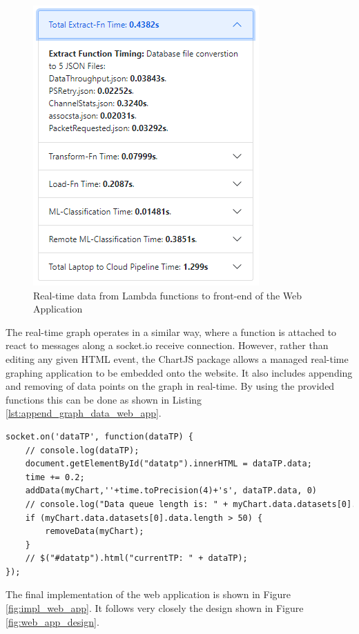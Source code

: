 \begin{figure}[ht]
    \centering
    \includegraphics[width=0.5\linewidth]{pages/Chapter4/Chapter 4 Images/newTiming.PNG}
    \caption{Real-time data from Lambda functions to front-end of the Web Application}
    \label{fig:real_time_data_front_end}
\end{figure}

The real-time graph operates in a similar way, where a function is attached to react to messages along a socket.io receive connection. However, rather than editing any given HTML event, the ChartJS \cite{chart_js} package allows a managed real-time graphing application to be embedded onto the website. It also includes appending and removing of data points on the graph in real-time. By using the provided functions this can be done as shown in Listing \ref{lst:append_graph_data_web_app}.

\begin{lstlisting}[language=HTML, caption={How data is updated and removed from the data throughput graph placed centrally in the Web App.}, label={lst:append_graph_data_web_app}]
socket.on('dataTP', function(dataTP) {
    // console.log(dataTP);
    document.getElementById("datatp").innerHTML = dataTP.data;
    time += 0.2;
    addData(myChart,''+time.toPrecision(4)+'s', dataTP.data, 0)
    // console.log("Data queue length is: " + myChart.data.datasets[0].data.length)
    if (myChart.data.datasets[0].data.length > 50) {
        removeData(myChart);
    }
    // $("#datatp").html("currentTP: " + dataTP);
});

\end{lstlisting}

The final implementation of the web application is shown in Figure \ref{fig:impl_web_app}. It follows very closely the design shown in Figure \ref{fig:web_app_design}.


